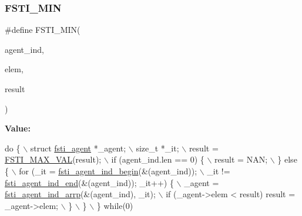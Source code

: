 \subsubsection{\texorpdfstring{F\+S\+T\+I\+\_\+\+M\+IN}{FSTI\_MIN}}
{\footnotesize\ttfamily \#define F\+S\+T\+I\+\_\+\+M\+IN(\begin{DoxyParamCaption}\item[{}]{agent\+\_\+ind,  }\item[{}]{elem,  }\item[{}]{result }\end{DoxyParamCaption})}

{\bfseries Value\+:}
\begin{DoxyCode}
\textcolor{keywordflow}{do} \{                          \(\backslash\)
        struct \mbox{\hyperlink{structfsti__agent}{fsti\_agent}} *\_agent;                                      \(\backslash\)
        size\_t *\_it;                                                    \(\backslash\)
        result = \mbox{\hyperlink{fsti-report_8h_a7a3f630a5d02d8f4d130a45685e3bc79}{FSTI\_MAX\_VAL}}(result);                                  \(\backslash\)
        if (agent\_ind.len == 0) \{                                       \(\backslash\)
            result = NAN;                                               \(\backslash\)
        \} \textcolor{keywordflow}{else} \{                                                        \(\backslash\)
            for (\_it = \mbox{\hyperlink{fsti-agent_8c_af8ec082c043d0719f2933f78c9b74879}{fsti\_agent\_ind\_begin}}(&(agent\_ind));              \(\backslash\)
                 \_it != \mbox{\hyperlink{fsti-agent_8c_a0a007fca1a85b26dc9f890b5c9f5649a}{fsti\_agent\_ind\_end}}(&(agent\_ind)); \_it++) \{      \(\backslash\)
                \_agent = \mbox{\hyperlink{fsti-agent_8c_a0d3fcfadb1159b63508be133b30f8df7}{fsti\_agent\_ind\_arrp}}(&(agent\_ind), \_it);        \(\backslash\)
                if (\_agent->elem < result) result = \_agent->elem;       \(\backslash\)
            \}                                                           \(\backslash\)
        \}                                                               \(\backslash\)
    \} \textcolor{keywordflow}{while}(0)
\end{DoxyCode}
\mbox{\label{fsti-report_8h_abd86f17f25e9c940c74a103963b43a29}} 
